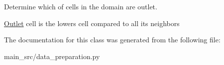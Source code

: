 Determine which of cells in the domain are outlet. 

\hyperlink{classmain__src_1_1data__preparation_1_1Outlet}{Outlet} cell is the lowers cell compared to all its neighbors 

The documentation for this class was generated from the following file\-:\begin{DoxyCompactItemize}
\item 
main\-\_\-src/data\-\_\-preparation.\-py\end{DoxyCompactItemize}
